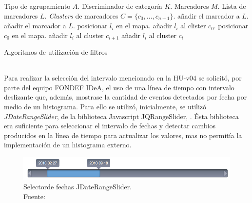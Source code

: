 \begin{algorithm}[!htb]
	\begin{algorithmic}
		\REQUIRE Tipo de agrupamiento $A$.
		\REQUIRE Discriminador de categoría $K$.
		\REQUIRE Marcadores $M$.
		\STATE Lista de marcadores $L$.
		\STATE \textit{Clusters} de marcadores $C = \{c_{0}, \dots, c_{n+1} \}$.
				\STATE añadir el marcador a $L$.
				\STATE añadir el marcador a $L$.
			\ENDIF
		\ENDFOR
				\STATE posicionar $l_{i}$ en el mapa.
			\ENDFOR
				\STATE añadir $l_{i}$ al clister $c_{0}$.
			\ENDFOR
			\STATE posicionar $c_{0}$ en el mapa.
		\ELSE
				\STATE añadir $l_{i}$ al cluster $c_{i+1}$
			\ENDFOR
				\STATE añadir $l_{i}$ al cluster $c_{i}$
			\ENDFOR
		\ENDIF
	\end{algorithmic}
	\caption{Algoritmos de utilización de filtros}
	\label{alg:filtroMarcadores}
\end{algorithm}\vphantom\\

Para realizar la selección del intervalo mencionado en la HU-v04 se solicitó, por parte del equipo FONDEF IDeA, el uso de una línea de tiempo con intervalo deslizante que, además, mostrase la cantidad de eventos detectados por fecha por medio de un histograma. Para ello se utilizó, inicialmente, se utilizó \textit{JDateRangeSlider}, de la biblioteca Javascript JQRangeSlider, \cite{JQRangeSlider}. Ésta biblioteca era suficiente para seleccionar el intervalo de fechas y detectar cambios producidos en la línea de tiempo para actualizar los valores, mas no permitía la implementación de un histograma externo.

\begin{figure}[H]
	\centering
	\captionsetup{justification=centering}
	\includegraphics[scale=0.6]{images/JDateRangeSlider.png}
	\caption[Selectorde fechas JDateRangeSlider.]{Selectorde fechas JDateRangeSlider.\\Fuente: \cite{JQRangeSlider}}
	\label{fig:JQRangeSlider}
\end{figure}

